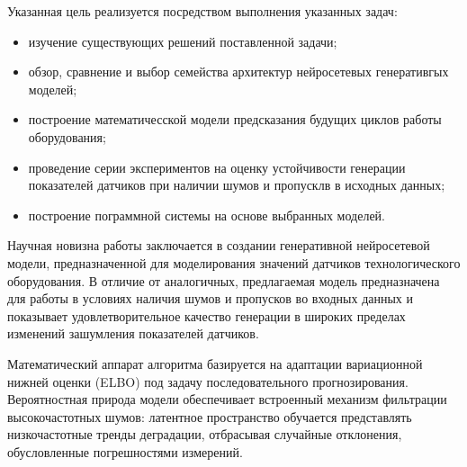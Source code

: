 \documentclass[14pt, a4paper, oneside]{extreport}
\begin{document}
Указанная цель реализуется посредством выполнения указанных задач:
\begin{itemize}
    \item изучение существующих решений поставленной задачи;
    \item обзор, сравнение и выбор семейства архитектур нейросетевых генеративгых моделей;
    \item построение математичесской модели предсказания будущих циклов работы оборудования;
    \item проведение серии экспериментов на оценку устойчивости генерации показателей датчиков при наличии шумов и пропусклв в исходных данных;
    \item построение пограммной системы на основе выбранных моделей.
\end{itemize}



Научная новизна работы заключается в создании генеративной нейросетевой модели, предназначенной для моделирования значений датчиков технологического оборудования. В отличие от аналогичных, предлагаемая модель предназначена для работы в условиях наличия шумов и пропусков во входных данных и показывает удовлетворительное качество генерации в широких пределах изменений зашумления показателей датчиков.

Математический аппарат алгоритма базируется на адаптации вариационной нижней оценки (ELBO) под задачу последовательного прогнозирования. Вероятностная природа модели обеспечивает встроенный механизм фильтрации высокочастотных шумов: латентное пространство обучается представлять низкочастотные тренды деградации, отбрасывая случайные отклонения, обусловленные погрешностями измерений.
\end{document}
